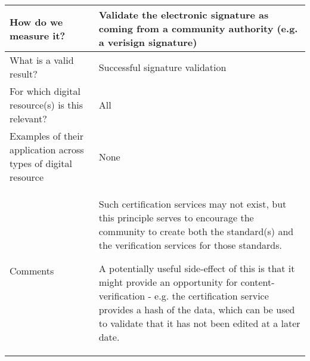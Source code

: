\documentclass[english]{article}
\begin{document}
\begin{longtable}{|p{5cm}|p{9cm}|}
\\



\hline
How do we measure it? &  


Validate the electronic signature as coming from a community authority (e.g. a verisign signature)


\\



\hline
What is a valid result? &  


Successful signature validation


\\



\hline
For which digital resource(s) is this relevant? &  All\\



\hline
Examples of their application across types of digital resource &  None

\\



\hline

Comments & 


Such certification services may not exist, but this principle serves to encourage the community to create both the standard(s) and the verification services for those standards.  

A potentially useful side-effect of this is that it might provide an opportunity for content-verification - e.g. the certification service provides a hash of the data, which can be used to validate that it has not been edited at a later date.


\\
\hline

\end{longtable}
\end{document}
